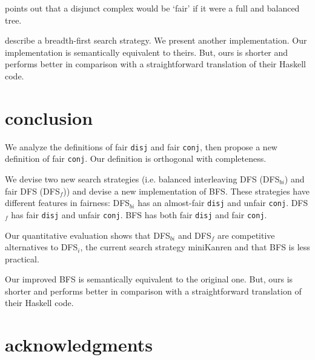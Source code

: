 \documentclass[format=acmlarge, review=true, authordraft=true]{acmart}
\newcommand{\conj}{\texttt{conj}}
\newcommand{\disj}{\texttt{disj}}
\newcommand{\DFSi }[0]{DFS$_{i}$}
\newcommand{\DFSf }[0]{DFS$_{f}$}
\newcommand{\DFSbi}[0]{DFS$_{bi}$}
\newcommand{\BFS}[0]{BFS}
\newcommand{\BFSser}[0]{BFS}
\begin{document}
\citet{yang2010adventures} points out that a disjunct complex would be `fair' 
if it were a full and balanced tree.

\citet{seres1999algebra} describe a breadth-first search 
strategy. We present another implementation. Our implementation is semantically 
equivalent to theirs. But, ours is shorter and performs better in comparison 
with a straightforward translation of their Haskell code.


\section{conclusion}

We analyze the definitions of fair \disj{} and fair \conj{}, then propose a 
new definition of fair \conj{}. Our definition is orthogonal with completeness.

We devise two new search strategies (i.e. balanced interleaving DFS 
(\DFSbi{}) and fair DFS (\DFSf{})) and devise a new 
implementation of \BFS. These strategies have different features 
in fairness: \DFSbi{} has an almost-fair \disj{} and unfair \conj{}. 
\DFSf{} has fair \disj{} and unfair \conj{}. \BFS{} has both fair
\disj{} and fair \conj{}.

Our quantitative evaluation shows that \DFSbi{} and \DFSf{} are competitive 
alternatives to \DFSi{}, the current search strategy miniKanren
and that \BFS{} is less practical.

Our improved \BFS{} is semantically equivalent to the original 
one. But, ours is shorter and performs better in comparison with a 
straightforward translation of their Haskell code.



\section*{acknowledgments}



\end{document}
